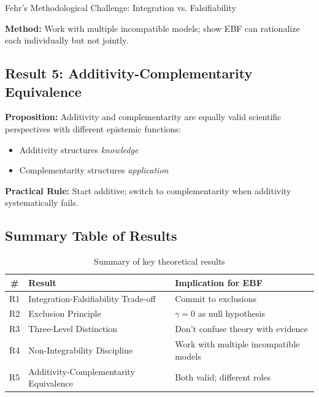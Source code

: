 \begin{chapter}{Fehr's Methodological Challenge: Integration vs. Falsifiability}
\begin{tcolorbox}[colback=gray!10!white,colframe=gray!75!black]
\textbf{Method:} Work with multiple incompatible models; show EBF can rationalize each individually but not jointly.
\end{tcolorbox}

\subsection{Result 5: Additivity-Complementarity Equivalence}

\begin{tcolorbox}[colback=gray!10!white,colframe=gray!75!black]
\textbf{Proposition:} Additivity and complementarity are equally valid scientific perspectives with different epistemic functions:
\begin{itemize}[noitemsep]
    \item Additivity structures \textit{knowledge}
    \item Complementarity structures \textit{application}
\end{itemize}

\textbf{Practical Rule:} Start additive; switch to complementarity when additivity systematically fails.
\end{tcolorbox}

\subsection{Summary Table of Results}

\begin{table}[h!]
\centering
\renewcommand{\arraystretch}{1.3}
\begin{tabular}{clp{7cm}}
\toprule
\textbf{\#} & \textbf{Result} & \textbf{Implication for EBF} \\
\midrule
R1 & Integration-Falsifiability Trade-off & Commit to exclusions \\
R2 & Exclusion Principle & $\gamma = 0$ as null hypothesis \\
R3 & Three-Level Distinction & Don't confuse theory with evidence \\
R4 & Non-Integrability Discipline & Work with multiple incompatible models \\
R5 & Additivity-Complementarity Equivalence & Both valid; different roles \\
\bottomrule
\end{tabular}
\caption{Summary of key theoretical results}
\end{table}



\end{chapter}
